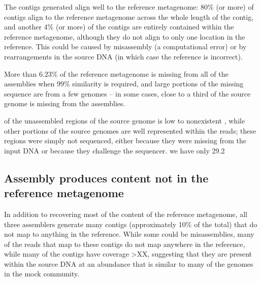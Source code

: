 \documentclass[10pt,a4paper,twocolumn]{article}
\begin{document}
The contigs generated align well to the reference metagenome: 80\% (or
more) of contigs align to the reference metagenome across the whole
length of the contig, and another 4\% (or more) of the contigs are
entirely contained within the reference metagenome, although they do
not align to only one location in the reference. This could be caused
by misassembly (a computational error) or by rearrangements in the
source DNA (in which case the reference is incorrect).
 
More than 6.23\% of the reference metagenome is missing from all of
the assemblies when 99\% similarity is required, and large portions of
the missing sequence are from a few genomes -- in some cases, close to
a third of the source genome is missing from the assemblies.

of the unassembled regions of the source genome is low to nonexistent
, while other portions of the source genomes are well represented
within the reads; these regions were simply not sequenced, either
because they were missing from the input DNA or because they challenge
the sequencer. %
we have only 29.2%


\subsection*{Assembly produces content not in the reference metagenome}

In addition to recovering most of the content of the reference
metagenome, all three assemblers generate many contigs (approximately
10\% of the total) that do not map to anything in the reference.
While some could be misassemblies, many of the reads that map to these
contigs do not map anywhere in the reference, while many of the
contigs have coverage >XX, suggesting that they are present within the
source DNA at an abundance that is similar to many of the genomes in
the mock community.
\end{document}
